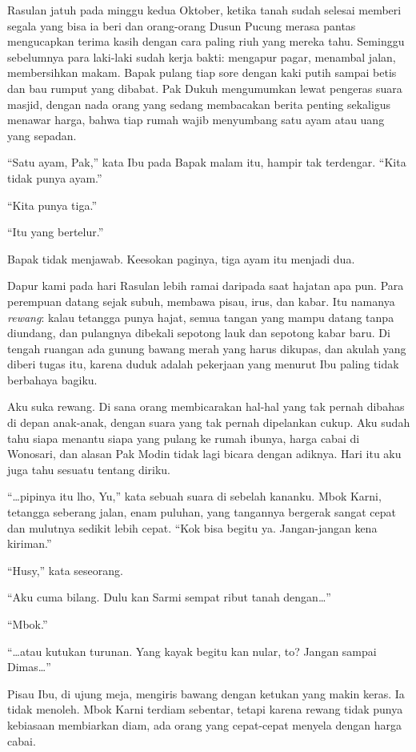 \documentclass[11pt,twoside,openany]{book}
\makeatletter
\newcommand{\scenebreak}{\par\vspace{0.9em}{\centering\textsc{*\hspace{0.7em}*\hspace{0.7em}*}\par}\vspace{0.9em}\@afterindentfalse\@afterheading}
\makeatother
\begin{document}
Rasulan jatuh pada minggu kedua Oktober, ketika tanah sudah selesai memberi segala yang bisa ia beri dan orang-orang Dusun Pucung merasa pantas mengucapkan terima kasih dengan cara paling riuh yang mereka tahu. Seminggu sebelumnya para laki-laki sudah kerja bakti: mengapur pagar, menambal jalan, membersihkan makam. Bapak pulang tiap sore dengan kaki putih sampai betis dan bau rumput yang dibabat. Pak Dukuh mengumumkan lewat pengeras suara masjid, dengan nada orang yang sedang membacakan berita penting sekaligus menawar harga, bahwa tiap rumah wajib menyumbang satu ayam atau uang yang sepadan.

``Satu ayam, Pak,'' kata Ibu pada Bapak malam itu, hampir tak terdengar. ``Kita tidak punya ayam.''

``Kita punya tiga.''

``Itu yang bertelur.''

Bapak tidak menjawab. Keesokan paginya, tiga ayam itu menjadi dua.

\scenebreak
Dapur kami pada hari Rasulan lebih ramai daripada saat hajatan apa pun. Para perempuan datang sejak subuh, membawa pisau, irus, dan kabar. Itu namanya \emph{rewang}: kalau tetangga punya hajat, semua tangan yang mampu datang tanpa diundang, dan pulangnya dibekali sepotong lauk dan sepotong kabar baru. Di tengah ruangan ada gunung bawang merah yang harus dikupas, dan akulah yang diberi tugas itu, karena duduk adalah pekerjaan yang menurut Ibu paling tidak berbahaya bagiku.

Aku suka rewang. Di sana orang membicarakan hal-hal yang tak pernah dibahas di depan anak-anak, dengan suara yang tak pernah dipelankan cukup. Aku sudah tahu siapa menantu siapa yang pulang ke rumah ibunya, harga cabai di Wonosari, dan alasan Pak Modin tidak lagi bicara dengan adiknya. Hari itu aku juga tahu sesuatu tentang diriku.

``\ldots pipinya itu lho, Yu,'' kata sebuah suara di sebelah kananku. Mbok Karni, tetangga seberang jalan, enam puluhan, yang tangannya bergerak sangat cepat dan mulutnya sedikit lebih cepat. ``Kok bisa begitu ya. Jangan-jangan kena kiriman.''

``Husy,'' kata seseorang.

``Aku cuma bilang. Dulu kan Sarmi sempat ribut tanah dengan\ldots{}''

``Mbok.''

``\ldots atau kutukan turunan. Yang kayak begitu kan nular, to? Jangan sampai Dimas\ldots{}''

Pisau Ibu, di ujung meja, mengiris bawang dengan ketukan yang makin keras. Ia tidak menoleh. Mbok Karni terdiam sebentar, tetapi karena rewang tidak punya kebiasaan membiarkan diam, ada orang yang cepat-cepat menyela dengan harga cabai.
\end{document}
